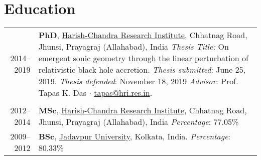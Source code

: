 \documentclass[10pt]{article}
\begin{document}
\section*{Education}
\begin{tabular}{rp{14cm}}
  2014--2019 & {\sffamily \bfseries PhD}, \href{http://www.hri.res.in/}{Harish-Chandra Research Institute},
              Chhatnag Road, Jhunsi, Prayagraj (Allahabad), India\newline
              {\itshape Thesis Title:} On emergent sonic geometry through the linear perturbation of relativistic black hole accretion.\newline 
              {\itshape Thesis submitted}: June 25, 2019. {\itshape Thesis defended}: November 18, 2019\newline
              {\itshape Advisor}: Prof. Tapas K. Das $\cdot$ \href{mailto:tapas@hri.res.in}{tapas@hri.res.in}.\\ \\
  2012--2014 & {\sffamily \bfseries MSc}, \href{http://www.hri.res.in/}{Harish-Chandra Research Institute}, Chhatnag Road, Jhunsi, Prayagraj (Allahabad), India\newline
              {\itshape Percentage}: 77.05\%\newline\\
  2009--2012 & {\sffamily \bfseries BSc}, \href{http://www.jaduniv.edu.in/}{Jadavpur University}, Kolkata, India.\newline
              {\itshape Percentage}: 80.33\%
\end{tabular}


\end{document}
